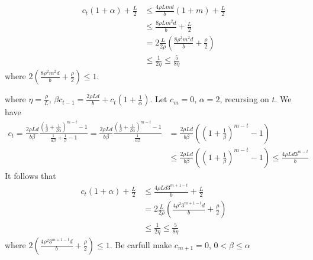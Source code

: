 \documentclass{article}
\theoremstyle{definition}
\theoremstyle{remark}
\begin{document}
{\begin{equation}
 \begin{split}
 c_t (1+{\alpha})  + \frac{L}{2} & \leq \frac{4\rho Lmd}{b} (1+m) + \frac{L}{2}\\
 & \leq \frac{8\rho L m^2d}{b} + \frac{L}{2} \\
 & = 2\frac{L}{2\rho} (\frac{8\rho^2 m^2 d}{b} + \frac{\rho}{2})\\
 & \leq \frac{1}{2\eta} \leq \frac{5}{ 8 \eta}
 \end{split}
 \end{equation}
 where $2 (\frac{8\rho^2 m^2 d}{b} + \frac{\rho}{2}) \leq 1$.
 {\color{red}
   where $\eta = \frac{\rho}{L}$, $\beta c_{t-1} = \frac{2\rho L d}{b}+c_t (1+\frac{1}{\alpha})$. Let $c_m=0$, $\alpha = {2}$, recursing on $t$. We have 
 \begin{equation}
 \begin{split}
 c_t = \frac{2\rho L d}{b\beta}\frac{(\frac{1}{\beta}+\frac{1}{\beta\alpha})^{m-t}-1}{\frac{1}{\alpha\beta}+\frac{1}{\beta}-1}=\frac{2\rho L d}{b\beta}\frac{(\frac{1}{\beta}+\frac{1}{\beta\alpha})^{m-t}-1}{\frac{1}{\alpha\beta}} &= \frac{2\rho L d}{b\beta} \left((1+\frac{1}{\beta})^{m-t}-1\right)\\
 &\leq \frac{2\rho L d}{b\beta} \left((1+\frac{1}{\beta})^{m-t}-1\right) \leq \frac{4\rho Ld 3^{m-t}}{b}
 \end{split}
 \end{equation}
 It follows that 
 \begin{equation}
 \begin{split}
 c_t (1+{\alpha})  + \frac{L}{2} & \leq \frac{4\rho Ld 3^{m+1-t}}{b}  + \frac{L}{2}\\
 & = 2\frac{L}{2\rho} (\frac{4\rho^2 3^{m+1-t} d}{b} + \frac{\rho}{2})\\
 & \leq \frac{1}{2\eta} \leq \frac{5}{ 8 \eta}
 \end{split}
 \end{equation}
 where $2 (\frac{4\rho^2 3^{m+1-t} d}{b} + \frac{\rho}{2}) \leq 1$. {\color{Green} Be carfull make $c_{m+1} = 0$, $0< \beta\leq \alpha$}
 
}}
\end{document}
